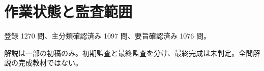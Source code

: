 \chapter{作業状態と監査範囲}
登録 1270 問、主分類確認済み 1097 問、要旨確認済み 1076 問。
\par 解説は一部の初稿のみ。初期監査と最終監査を分け、最終完成は未判定。全問解説の完成教材ではない。

